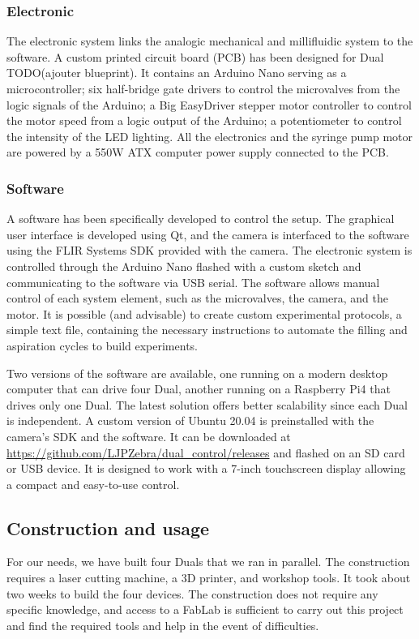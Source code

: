   \subsubsection{Electronic}
  The electronic system links the analogic mechanical and millifluidic system to the software. A custom printed circuit board (PCB) has been designed for Dual TODO(ajouter blueprint). It contains an Arduino Nano serving as a microcontroller; six half-bridge gate drivers to control the microvalves from the logic signals of the Arduino; a Big EasyDriver stepper motor controller to control the motor speed from a logic output of the Arduino; a potentiometer to control the intensity of the LED lighting. All the electronics and the syringe pump motor are powered by a 550W ATX computer power supply connected to the PCB.

  \subsubsection{Software}
  A software has been specifically developed to control the setup. The graphical user interface is developed using Qt, and the camera is interfaced to the software using the FLIR Systems SDK provided with the camera. The electronic system is controlled through the Arduino Nano flashed with a custom sketch and communicating to the software via USB serial. The software allows manual control of each system element, such as the microvalves, the camera, and the motor. It is possible (and advisable) to create custom experimental protocols, a simple text file, containing the necessary instructions to automate the filling and aspiration cycles to build experiments.

  Two versions of the software are available, one running on a modern desktop computer that can drive four Dual, another running on a Raspberry Pi4 that drives only one Dual. The latest solution offers better scalability since each Dual is independent. A custom version of Ubuntu 20.04 is preinstalled with the camera's SDK and the software. It can be downloaded at \url{https://github.com/LJPZebra/dual_control/releases} and flashed on an SD card or USB device. It is designed to work with a 7-inch touchscreen display allowing a compact and easy-to-use control.

  \subsection{Construction and usage}
  For our needs, we have built four Duals that we ran in parallel. The construction requires a laser cutting machine, a 3D printer, and workshop tools. It took about two weeks to build the four devices. The construction does not require any specific knowledge, and access to a FabLab is sufficient to carry out this project and find the required tools and help in the event of difficulties.

